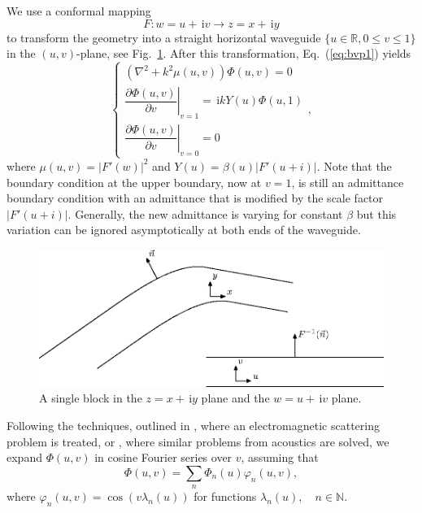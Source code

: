 \documentclass[numreferences]{kluwer}
\providecommand{\abs}[1]{\left\lvert#1\right\rvert}
\renewcommand{\phi}{\varphi}
\renewcommand{\Phi}{\varPhi}
\renewcommand{\i}{\,\mathrm{i}}
\newcommand{\R}{\mathbb R}
\newcommand{\pd}[2]{\dfrac{\partial#1}{\partial#2}}
\renewcommand{\Phi}{\varPhi}
\begin{document}
We use a conformal mapping
\begin{equation*}
  F:w=u+\i v\to z=x+\i y
\end{equation*}
to transform the geometry into a straight horizontal waveguide \mbox{$\{u\in\R,0\le v\le1\}$} in the $(u,v)$-plane, see
Fig.~\ref{fig:confmap}. After this transformation, Eq.~(\ref{eq:bvp1})
yields
\begin{equation}
  \label{eq:bvp2}
  \begin{cases}
    \left(\nabla^2+k^2\mu(u,v)\right)\Phi(u,v)=0\\[1ex]
    \left.\pd{\Phi(u,v)}v\right|_{v=1}=\i kY(u)\Phi(u,1)\\[1.5ex]
    \left.\pd{\Phi(u,v)}v\right|_{v=0}=0
  \end{cases},
\end{equation}
where $\mu(u,v)=\abs{F'(w)}^2$ and $Y(u)=\beta(u)\abs{F'(u+i)}$. Note that the boundary condition at the upper boundary, now at $v=1$, is still an admittance boundary condition with an admittance that is modified by the scale factor $\abs{F'(u+i)}$. Generally, the new admittance is varying for constant $\beta$ but this variation can be ignored asymptotically at both ends of the waveguide.
\begin{figure}[htb]
  \centering
  \includegraphics[scale=1]{waveguide-3}
  \caption{A single block in the $z=x+\i y$ plane and the $w=u+\i v$
    plane.}
  \label{fig:confmap}
\end{figure}

Following the techniques, outlined in \cite{Andersson-Nilsson:2009},
where an electromagnetic scattering problem is treated, or
\cite{Nilsson:2002}, where similar problems from acoustics are solved,
we expand $\Phi(u,v)$ in cosine Fourier series over $v$, assuming that
\begin{equation}
  \label{eq:fcosseries}
  \Phi(u,v)=\sum_n\Phi_n(u)\phi_n(u,v),
\end{equation}
where $\phi_n(u,v)=\cos(v\lambda_n(u))$ for functions
$\lambda_n(u),\quad n\in\mathbb N$.
\end{document}
